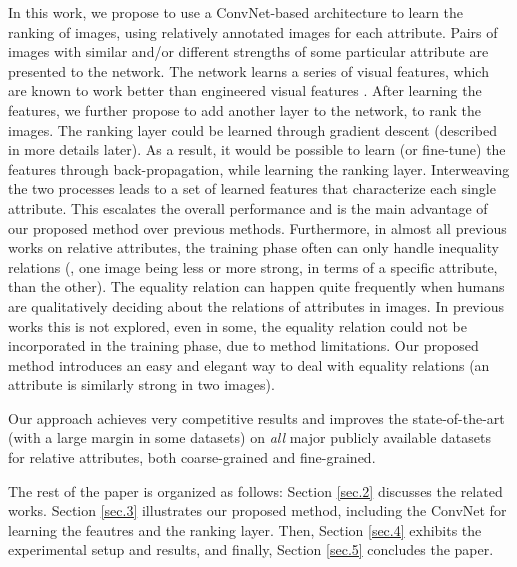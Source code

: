 In this work, we propose to use a ConvNet-based architecture to learn the ranking of images, using relatively annotated images for each attribute. Pairs of images with similar and/or different strengths of some particular attribute are presented to the network. The network  learns a series of visual features, which are known to work better than engineered visual features \cite{offtheshelf}. After learning the features, we further propose to add another layer to the network, to rank the images. The ranking layer could be learned through gradient descent (described in more details later). As a result, it would be possible to learn (or fine-tune) the features through back-propagation, while learning the ranking layer. Interweaving the two processes leads to a set of learned features that characterize each single attribute. This escalates the overall performance and is the main advantage of our proposed method over previous methods. Furthermore, in almost all previous works on relative attributes, the training phase often can only handle inequality relations (\ie, one image being less or more strong, in terms of a specific attribute, than the other). The equality relation can happen quite frequently when humans are qualitatively deciding about the relations of attributes in images. In previous works this is not explored, even in some, the equality relation could not be incorporated in the training phase, due to method limitations. Our proposed method introduces an easy and elegant way to deal with equality relations (\ie an attribute is similarly strong in two images).

Our approach achieves very competitive results and improves the state-of-the-art (with a large margin in some datasets) on {\it all} major publicly available datasets for relative attributes, both coarse-grained and fine-grained.

The rest of the paper is organized as follows: Section \ref{sec.2} discusses the related works. Section \ref{sec.3} illustrates our proposed method, including the ConvNet for learning the feautres and the ranking layer. Then, Section \ref{sec.4} exhibits the experimental setup and results, and finally, Section \ref{sec.5} concludes the paper.
